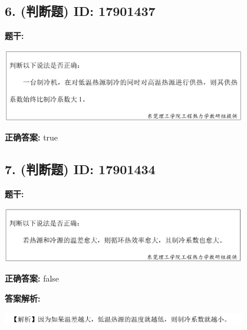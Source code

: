 \documentclass[12pt]{article}
\begin{document}
\vspace{0.5em}\hrulefill\vspace{1em}

\subsection*{6. (判断题) \small ID: 17901437}

\textbf{题干:}


\begin{center}\includegraphics[width=0.8\textwidth, height=0.25\textheight, keepaspectratio]{question_6_17901437/title_img_1.png}\end{center}

\textbf{正确答案:}
true

\vspace{0.5em}\hrulefill\vspace{1em}

\subsection*{7. (判断题) \small ID: 17901434}

\textbf{题干:}


\begin{center}\includegraphics[width=0.8\textwidth, height=0.25\textheight, keepaspectratio]{question_7_17901434/title_img_1.png}\end{center}

\textbf{正确答案:}
false

\textbf{答案解析:}


\begin{center}\includegraphics[width=0.8\textwidth, height=0.25\textheight, keepaspectratio]{question_7_17901434/correct_replay_img_1.png}\end{center}
\end{document}
